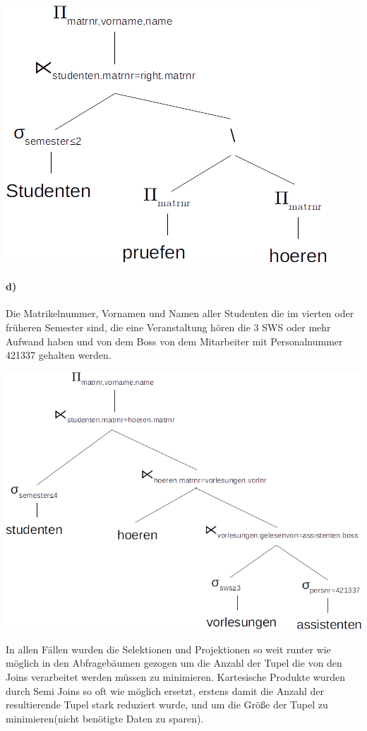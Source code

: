 \documentclass[11pt,a4paper,parskip=half ]{scrartcl}
\begin{document}
	\includegraphics[scale=.7]{1c.png}
	
	\paragraph{d)} Die Matrikelnummer, Vornamen und Namen aller Studenten die im vierten oder früheren Semester sind, die eine Veranstaltung hören die 3 SWS oder mehr Aufwand haben und von dem Boss von dem Mitarbeiter mit Personalnummer 421337 gehalten werden.
	
	\includegraphics[scale=.6]{1d.png}
	
	
	In allen Fällen wurden die Selektionen und Projektionen so weit runter wie möglich in den Abfragebäumen gezogen um die Anzahl der Tupel die von den Joins verarbeitet werden müssen zu minimieren. Kartesische Produkte wurden durch Semi Joins so oft wie möglich ersetzt, erstens damit die Anzahl der resultierende Tupel stark reduziert wurde, und um die Größe der Tupel zu minimieren(nicht benötigte Daten zu sparen).
	
\end{document}
